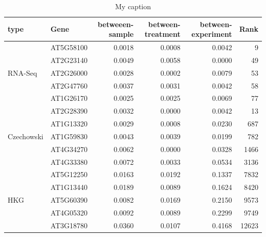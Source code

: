 \documentclass[11pt, a4paper]{article}
\begin{document}
\begin{table}[]
	\centering
	\caption{My caption}
	\label{table:15genes}
	\begin{tabular}{llrrrr}
		type                        & Gene      & betweeen-sample & between-treatment & between-experiment & Rank  \\  \hline
		\multirow{5}{*}{RNA-Seq}    & AT5G58100 & 0.0018          & 0.0008            & 0.0042             & 9     \\
		& AT2G23140 & 0.0049          & 0.0058            & 0.0000             & 49    \\
		& AT2G26000 & 0.0028          & 0.0002            & 0.0079             & 53    \\
		& AT2G47760 & 0.0037          & 0.0031            & 0.0042             & 58    \\
		& AT1G26170 & 0.0025          & 0.0025            & 0.0069             & 77    \\  \hline
		\multirow{5}{*}{Czechowski} & AT2G28390 & 0.0032          & 0.0000            & 0.0042             & 13    \\
		& AT1G13320 & 0.0029          & 0.0008            & 0.0230             & 687   \\
		& AT1G59830 & 0.0043          & 0.0039            & 0.0199             & 782   \\
		& AT4G34270 & 0.0062          & 0.0000            & 0.0328             & 1466  \\
		& AT4G33380 & 0.0072          & 0.0033            & 0.0534             & 3136  \\   \hline
	 \multirow{5}{*}{HKG}              & AT5G12250 & 0.0163          & 0.0192            & 0.1337             & 7832  \\   
		& AT1G13440 & 0.0189          & 0.0089            & 0.1624             & 8420  \\
		& AT5G60390 & 0.0082          & 0.0169            & 0.2150             & 9573  \\
		& AT4G05320 & 0.0092          & 0.0089            & 0.2299             & 9749  \\
		& AT3G18780 & 0.0360          & 0.0107            & 0.4168             & 12623  \\   \hline
	\end{tabular}
\end{table}

\end{document}
